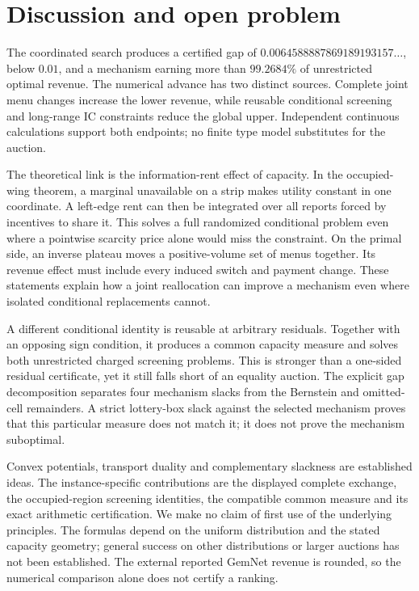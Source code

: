 \documentclass[11pt]{article}
\begin{document}
\section{Discussion and open problem}

The coordinated search produces a certified gap of
$0.0064588887869189193157\ldots$, below $0.01$, and a mechanism earning
more than $99.2684\%$ of unrestricted optimal revenue. The numerical
advance has two distinct sources. Complete joint menu changes increase the
lower revenue, while reusable conditional screening and long-range IC
constraints reduce the global upper. Independent continuous calculations
support both endpoints; no finite type model substitutes for the auction.

The theoretical link is the information-rent effect of capacity. In the
occupied-wing theorem, a marginal unavailable on a strip makes utility
constant in one coordinate. A left-edge rent can then be integrated over
all reports forced by incentives to share it. This solves a full randomized
conditional problem even where a pointwise scarcity price alone would miss
the constraint. On the primal side, an inverse plateau moves a positive-volume
set of menus together. Its revenue effect must include every induced switch
and payment change. These statements explain how a joint reallocation can
improve a mechanism even where isolated conditional replacements cannot.

A different conditional identity is reusable at arbitrary residuals. Together
with an opposing sign condition, it produces a common capacity measure and
solves both unrestricted charged screening problems. This is stronger than
a one-sided residual certificate, yet it still falls short of an equality
auction. The explicit gap decomposition separates four mechanism slacks
from the Bernstein and omitted-cell remainders. A strict lottery-box slack
against the selected mechanism proves that this particular measure does not
match it; it does not prove the mechanism suboptimal.

Convex potentials, transport duality and complementary slackness are established
ideas. The instance-specific contributions are the displayed complete exchange,
the occupied-region screening identities, the compatible common measure and
its exact arithmetic certification. We make no claim of first use of the
underlying principles. The formulas depend on the uniform distribution and
the stated capacity geometry; general success on other distributions or larger
auctions has not been established. The external reported GemNet revenue is
rounded, so the numerical comparison alone does not certify a ranking.
\end{document}
